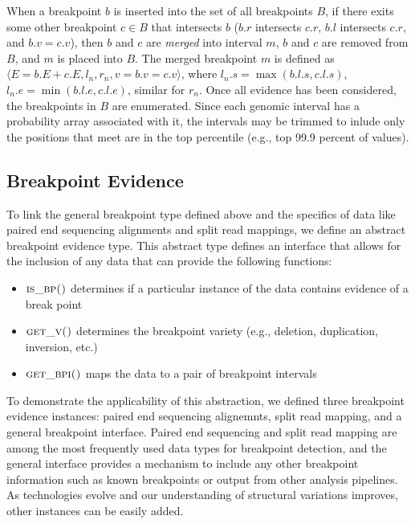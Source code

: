 \documentclass[11pt]{article}
\begin{document}
When a breakpoint $b$ is inserted into the set of all breakpoints $B$, if there
exits some other breakpoint $c \in B$ that intersects $b$ ($b.r$
intersects $c.r$, $b.l$ intersects $c.r$, and $b.v = c.v$), then $b$ and $c$
are {\em merged} into interval $m$, $b$ and $c$ are removed from $B$, and $m$ is
placed into $B$.  The merged breakpoint $m$ is defined as
$\langle E = b.E + c.E, l_n, r_n, v = b.v = c.v\rangle$, where 
$l_n.s = \max(b.l.s, c.l.s)$, $l_n.e = \min(b.l.e, c.l.e)$, similar for 
$r_n$.  Once all evidence has been considered, the breakpoints in $B$ are
enumerated.  Since each genomic interval has a probability array associated with
it, the intervals may be trimmed to inlude only the positions that meet are
in the top percentile (e.g., top 99.9 percent of values).

\subsection{Breakpoint Evidence}

To link the general breakpoint type defined above and the specifics of data like
paired end sequencing alignments and split read mappings, we define an abstract
breakpoint evidence type.  This abstract type defines an interface that allows
for the inclusion of any data that can provide the following functions:

\begin{itemize}
	\item $\textsc{is\_bp()}$ determines if a particular
	instance of the data contains evidence of a break point
	\item $\textsc{get\_v()}$ determines the breakpoint 
	variety (e.g., deletion, duplication, inversion, etc.)
	\item $\textsc{get\_bpi()}$ maps the data to a pair of
	breakpoint intervals
\end{itemize}

To demonstrate the applicability of this abstraction, we defined three
breakpoint evidence instances: paired end sequencing alignemnts, split read
mapping, and a general breakpoint interface.  Paired end sequencing and split
read mapping are among the most frequently used data types for breakpoint
detection, and the general interface provides a mechanism to include any other
breakpoint information such as known breakpoints or output from other analysis
pipelines.  As technologies evolve and our understanding of structural
variations improves, other instances can be easily added.
\end{document}
